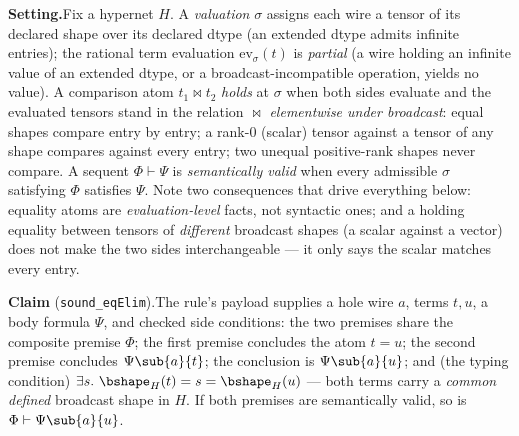 

\textbf{Setting.}\enspace Fix a hypernet $H$. A \emph{valuation} $\sigma$
assigns each wire a tensor of its declared shape over its declared
dtype (an extended dtype admits infinite entries); the rational term
evaluation
$\mathrm{ev}_\sigma(t)$ is \emph{partial} (a wire holding an infinite
value of an extended dtype, or a broadcast-incompatible operation, yields
no value). A comparison atom $t_1 \bowtie t_2$ \emph{holds} at $\sigma$
when both sides evaluate and the evaluated tensors stand in the relation
$\bowtie$ \emph{elementwise under broadcast}: equal shapes compare entry
by entry; a rank-0 (scalar) tensor against a tensor of any shape compares
against every entry; two unequal positive-rank shapes never compare. A
sequent $\Phi \vdash \Psi$ is \emph{semantically valid} when every
admissible $\sigma$ satisfying $\Phi$ satisfies $\Psi$. Note two
consequences that drive everything below: equality atoms are
\emph{evaluation-level} facts, not syntactic ones; and a holding equality
between tensors of \emph{different} broadcast shapes (a scalar against a
vector) does not make the two sides interchangeable --- it only says the
scalar matches every entry.

\textbf{Claim} (\texttt{sound\_eqElim}).\enspace The rule's payload
supplies a hole wire $a$, terms $t, u$, a body formula $\Psi$, and checked
side conditions: the two premises share the composite premise $\Phi$; the
first premise concludes the atom $t = u$; the second premise concludes
$\Psi\sub{a}{t}$; the conclusion is $\Psi\sub{a}{u}$; and (the typing
condition) $\exists s.\ \bshape_H(t) = s = \bshape_H(u)$ --- both terms
carry a \emph{common defined} broadcast shape in $H$. If both premises are
semantically valid, so is $\Phi \vdash \Psi\sub{a}{u}$.

